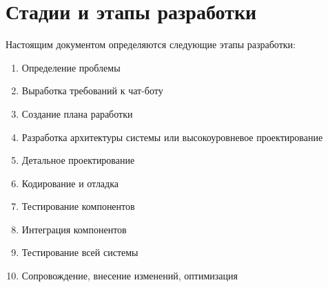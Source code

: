 \section{Стадии и этапы разработки}
\label{sec:dev}
Настоящим документом определяются следующие этапы разработки:
\begin{enumerate}
    \item
        Определение проблемы
    \item
        Выработка требований к чат-боту
    \item
        Создание плана раработки
    \item
        Разработка архитектуры системы или высокоуровневое проектирование
    \item
        Детальное проектирование
    \item
        Кодирование и отладка
    \item
        Тестирование компонентов
    \item
        Интеграция компонентов
    \item
        Тестирование всей системы
    \item
        Сопровождение, внесение изменений, оптимизация
\end{enumerate}
